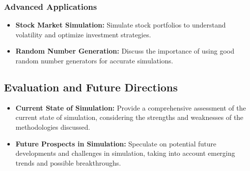 \subsubsection{Advanced Applications}
\begin{itemize}
    \item \textbf{Stock Market Simulation:} Simulate stock portfolios to understand volatility and optimize investment strategies.
    \item \textbf{Random Number Generation:} Discuss the importance of using good random number generators for accurate simulations.
\end{itemize}

\subsection{Evaluation and Future Directions}
\begin{itemize}
    \item \textbf{Current State of Simulation:} Provide a comprehensive assessment of the current state of simulation, considering the strengths and weaknesses of the methodologies discussed.
    \item \textbf{Future Prospects in Simulation:} Speculate on potential future developments and challenges in simulation, taking into account emerging trends and possible breakthroughs.
\end{itemize}
